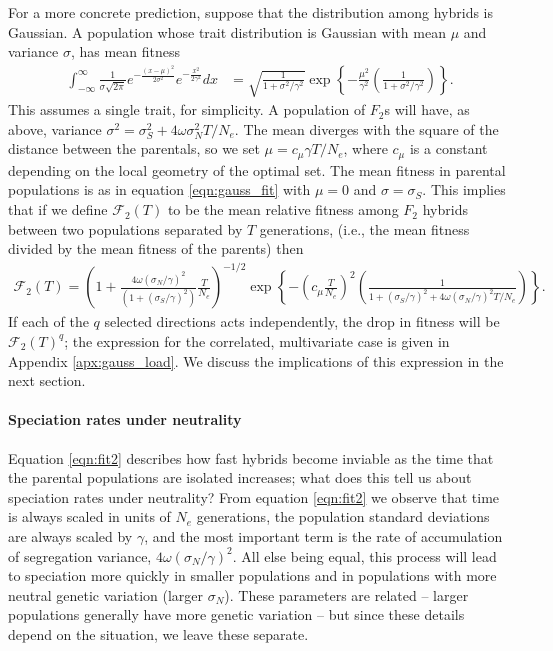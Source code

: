 \documentclass{article}
\newcommand{\1}{\mathbbm{1}}
\newcommand{\fit}{\mathcal{F}}
\begin{document}
For a more concrete prediction, suppose that the distribution among hybrids is Gaussian.
A population whose trait distribution is Gaussian with mean $\mu$ and variance $\sigma$,
has mean fitness 
\begin{align} \label{eqn:gauss_fit}
\int_{-\infty}^\infty \frac{1}{\sigma\sqrt{2\pi}} e^{-\frac{(x-\mu)^2}{2\sigma^2}} e^{-\frac{x^2}{2\gamma^2}} dx
&=
\sqrt{\frac{1}{1 + \sigma^2/\gamma^2}} \exp\left\{-\frac{\mu^2}{\gamma^2}\left(\frac{1}{1 + \sigma^2/\gamma^2}\right)\right\} .
\end{align}
This assumes a single trait, for simplicity. %
A population of $F_2$s will have, as above, variance $\sigma^2 = \sigma^2_S + 4 \omega \sigma^2_N T/N_e$.
The mean diverges with the square of the distance between the parentals, so we set $\mu = c_\mu \gamma T/N_e$,
where $c_\mu$ is a constant depending on the local geometry of the optimal set.
The mean fitness in parental populations is as in equation \ref{eqn:gauss_fit} with $\mu=0$ and $\sigma = \sigma_S$.
This implies that if we define $\fit_2(T)$ to be the mean relative fitness among $F_2$ hybrids
between two populations separated by $T$ generations, 
(i.e., the mean fitness divided by the mean fitness of the parents)
then
\begin{align} \label{eqn:fit2}
\fit_2(T) = 
  \left(1 + \frac{4 \omega (\sigma_N/\gamma)^2}{(1 + (\sigma_S/\gamma)^2)} \frac{T}{N_e} \right)^{-1/2} 
     \exp\left\{-\left(c_\mu \frac{T}{N_e}\right)^2 \left(\frac{1}{1 + (\sigma_S/\gamma)^2 + 4 \omega (\sigma_N/\gamma)^2 T/N_e}\right)\right\} .
\end{align}
If each of the $q$ selected directions acts independently,
the drop in fitness will be $\fit_2(T)^q$;
the expression for the correlated, multivariate case is given in Appendix \ref{apx:gauss_load}.
We discuss the implications of this expression in the next section.


\paragraph{Speciation rates under neutrality}
Equation \eqref{eqn:fit2} describes how fast hybrids become inviable 
as the time that the parental populations are isolated increases;
what does this tell us about speciation rates under neutrality?
From equation \eqref{eqn:fit2} we observe that
time is always scaled in units of $N_e$ generations,
the population standard deviations are always scaled by $\gamma$,
and the most important term is the rate of accumulation of segregation variance,
$4 \omega (\sigma_N/\gamma)^2$.
All else being equal, this process will lead to speciation more quickly in smaller populations
and in populations with more neutral genetic variation (larger $\sigma_N$).
These parameters are related -- larger populations generally have more genetic variation --
but since these details depend on the situation, we leave these separate.
\end{document}
